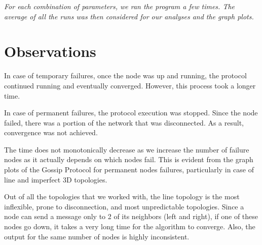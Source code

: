 \documentclass[11pt]{article}
\begin{document}
\textit{For each combination of parameters, we ran the program a few times. The average of all the runs was then considered for our analyses and the graph plots.}

\section{Observations}
In case of temporary failures, once the node was up and running, the protocol continued running and eventually converged. However, this process took a longer time.

In case of permanent failures, the protocol execution was stopped. Since the node failed, there was a portion of the network that was disconnected. As a result, convergence was not achieved.

The time does not monotonically decrease as we increase the number of failure nodes as it actually depends on which nodes fail. This is evident from the graph plots of the Gossip Protocol for permanent nodes failures, particularly in case of line and imperfect 3D topologies.

Out of all the topologies that we worked with, the line topology is the most inflexible, prone to disconnection, and most unpredictable topologies. Since a node can send a message only to 2 of its neighbors (left and right), if one of these nodes go down, it takes a very long time for the algorithm to converge. Also, the output for the same number of nodes is highly inconsistent.
\end{document}
